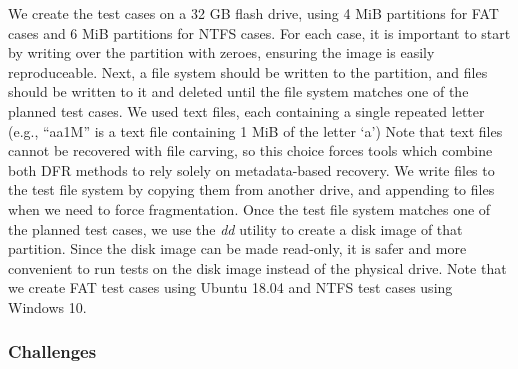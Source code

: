 We create the test cases on a 32 GB flash drive, using 4 MiB partitions for FAT cases and 6 MiB partitions for NTFS cases.
For each case, it is important to start by writing over the partition with zeroes, ensuring the image is easily reproduceable.
Next, a file system should be written to the partition, and files should be written to it and deleted until the file system matches one of the planned test cases.
We used text files, each containing a single repeated letter (e.g., ``aa1M'' is a text file containing 1 MiB of the letter `a')
Note that text files cannot be recovered with file carving, so this choice forces tools which combine both DFR methods to rely solely on metadata-based recovery.
We write files to the test file system by copying them from another drive, and appending to files when we need to force fragmentation.
Once the test file system matches one of the planned test cases, we use the \emph{dd} utility to create a disk image of that partition.
Since the disk image can be made read-only, it is safer and more convenient to run tests on the disk image instead of the physical drive.
Note that we create FAT test cases using Ubuntu 18.04 and NTFS test cases using Windows 10.

\subsubsection{Challenges}

